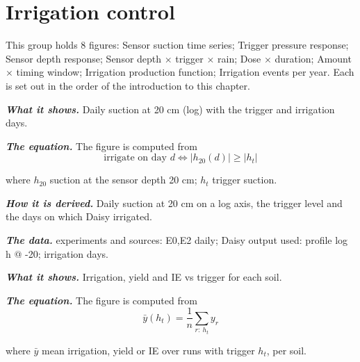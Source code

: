 \section{Irrigation control}
This group holds 8 figures: Sensor suction time series; Trigger pressure response; Sensor depth response; Sensor depth $\times$ trigger $\times$ rain; Dose $\times$ duration; Amount $\times$ timing window; Irrigation production function; Irrigation events per year. Each is set out in the order of the introduction to this chapter.
\par\vspace{6pt}\noindent{}\par\nobreak
{}\label{fig:a20_5}
\par\noindent\textbf{\color{khmag}\emph{What it shows.}} Daily suction at 20 cm (log) with the trigger and irrigation days.
\par\noindent\textbf{\color{khmag}\emph{The equation.}} The figure is computed from
\begin{equation}\boxed{\text{irrigate on day } d \iff |h_{20}(d)|\ge |h_t|}\end{equation}
\par\noindent where $h_{20}$ suction at the sensor depth 20 cm; $h_t$ trigger suction.
\par\noindent\textbf{\color{khmag}\emph{How it is derived.}} Daily suction at 20 cm on a log axis, the trigger level and the days on which Daisy irrigated.
\par\noindent\textbf{\color{khmag}\emph{The data.}} experiments and sources: E0,E2 daily; Daisy output used: profile log h @ -20; irrigation days.
\par\vspace{6pt}\noindent{}\par\nobreak
{}\label{fig:a20_6}
\par\noindent\textbf{\color{khmag}\emph{What it shows.}} Irrigation, yield and IE vs trigger for each soil.
\par\noindent\textbf{\color{khmag}\emph{The equation.}} The figure is computed from
\begin{equation}\boxed{\bar y(h_t)=\dfrac1n\sum_{r:\ h_t} y_r}\end{equation}
\par\noindent where $\bar y$ mean irrigation, yield or IE over runs with trigger $h_t$, per soil.

